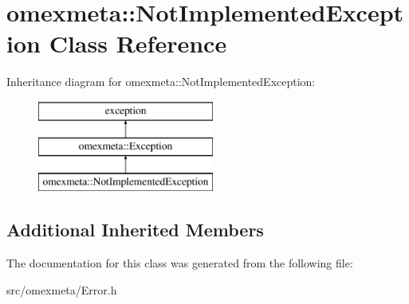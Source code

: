 \hypertarget{classomexmeta_1_1NotImplementedException}{}\section{omexmeta\+:\+:Not\+Implemented\+Exception Class Reference}
\label{classomexmeta_1_1NotImplementedException}
Inheritance diagram for omexmeta\+:\+:Not\+Implemented\+Exception\+:\begin{figure}[H]
\begin{center}
\leavevmode
\includegraphics[height=3.000000cm]{classomexmeta_1_1NotImplementedException}
\end{center}
\end{figure}
\subsection*{Additional Inherited Members}


The documentation for this class was generated from the following file\+:\begin{DoxyCompactItemize}
\item 
src/omexmeta/Error.\+h\end{DoxyCompactItemize}
